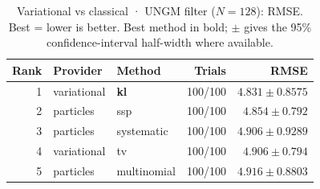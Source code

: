 \begin{table}[!htbp]
\centering
\small
\caption{Variational vs classical · UNGM filter ($N=128$): RMSE. Best = lower is better. Best method in bold; $\pm$ gives the 95\% confidence-interval half-width where available.}
\label{tab:variational-vs-classical-ungm-filter-rmse}
\begin{tabular}{rllrr}
\toprule
Rank & Provider & Method & Trials & RMSE \\
\midrule
1 & variational & \textbf{kl} & 100/100 & $\mathbf{4.831 \pm 0.8575}$ \\
2 & particles & ssp & 100/100 & $4.854 \pm 0.792$ \\
3 & particles & systematic & 100/100 & $4.906 \pm 0.9289$ \\
4 & variational & tv & 100/100 & $4.906 \pm 0.794$ \\
5 & particles & multinomial & 100/100 & $4.916 \pm 0.8803$ \\
\bottomrule
\end{tabular}
\end{table}
